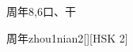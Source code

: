 \begin{entry}{周年}{8,6}{⼝、⼲}
  \begin{phonetics}{周年}{zhou1nian2}[][HSK 2]
  \end{phonetics}
\end{entry}
